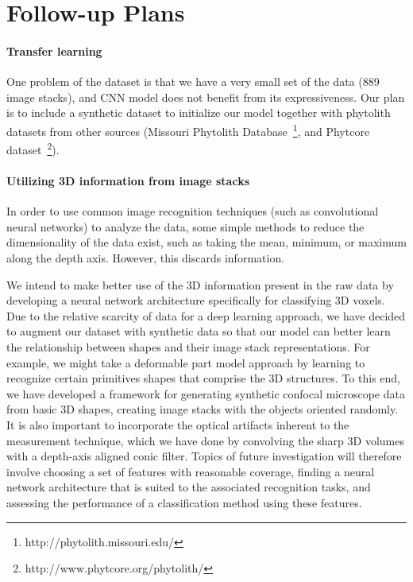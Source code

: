 \documentclass{article}
\begin{document}
\section{Follow-up Plans}

\paragraph{Transfer learning} One problem of the dataset is that we have a very small set of the data (889 image stacks), and CNN model does not benefit from its expressiveness. Our plan is to include a synthetic dataset to initialize our model together with phytolith datasets from other sources (Missouri Phytolith Database~\footnote{http://phytolith.missouri.edu/}, and Phytcore dataset~\footnote{http://www.phytcore.org/phytolith/}).

\paragraph{Utilizing 3D information from image stacks}

In order to use common image recognition techniques (such as convolutional neural networks) to analyze the data, some simple methods to reduce the dimensionality of the data exist, such as taking the mean, minimum, or maximum along the depth axis. However, this discards information. 

We intend to make better use of the 3D information present in the raw data by developing a neural network architecture specifically for classifying 3D voxels\cite{DBLP:conf/iros/MaturanaS15,brock2016generative}. Due to the relative scarcity of data for a deep learning approach, we have decided to augment our dataset with synthetic data so that our model can better learn the relationship between shapes and their image stack representations. For example, we might take a deformable part model approach by learning to recognize certain primitives shapes that comprise the 3D structures. To this end, we have developed a framework for generating synthetic confocal microscope data from basic 3D shapes, creating image stacks with the objects oriented randomly. It is also important to incorporate the optical artifacts inherent to the measurement technique, which we have done by convolving the sharp 3D volumes with a depth-axis aligned conic filter. Topics of future investigation will therefore involve choosing a set of features with reasonable coverage, finding a neural network architecture that is suited to the associated recognition tasks, and assessing the performance of a classification method using these features.



\end{document}
